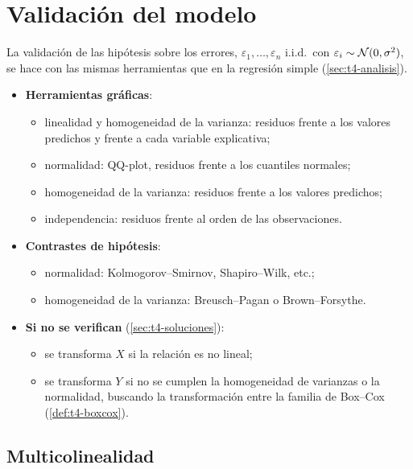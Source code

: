 \section{Validación del modelo}
\label{sec:t6-validacion}

La validación de las hipótesis sobre los errores, $\varepsilon_1,\ldots,\varepsilon_n$ i.i.d.\ con
$\varepsilon_i\sim\mathcal{N}(0,\sigma^2)$, se hace con las mismas herramientas que en la regresión
simple (\cref{sec:t4-analisis}).
\begin{itemize}
  \item \textbf{Herramientas gráficas}:
    \begin{itemize}
      \item linealidad y homogeneidad de la varianza: residuos frente a los valores predichos y
        frente a cada variable explicativa;
      \item normalidad: QQ-plot, residuos frente a los cuantiles normales;
      \item homogeneidad de la varianza: residuos frente a los valores predichos;
      \item independencia: residuos frente al orden de las observaciones.
    \end{itemize}
  \item \textbf{Contrastes de hipótesis}:
    \begin{itemize}
      \item normalidad: Kolmogorov--Smirnov, Shapiro--Wilk, etc.;
      \item homogeneidad de la varianza: Breusch--Pagan o Brown--Forsythe.
    \end{itemize}
  \item \textbf{Si no se verifican} (\cref{sec:t4-soluciones}):
    \begin{itemize}
      \item se transforma $X$ si la relación es no lineal;
      \item se transforma $Y$ si no se cumplen la homogeneidad de varianzas o la normalidad,
        buscando la transformación entre la familia de Box--Cox (\cref{def:t4-boxcox}).
    \end{itemize}
\end{itemize}

\subsection{Multicolinealidad}
\label{sec:t6-multicolinealidad}

